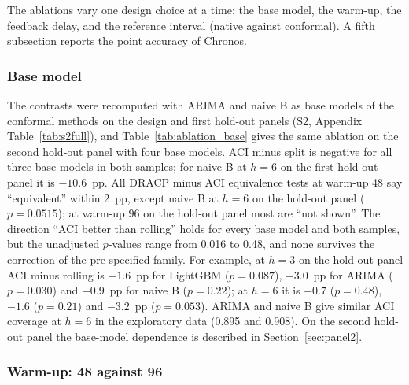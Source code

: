 The ablations vary one design choice at a time: the base model, the warm-up, the feedback delay, and the reference interval (native against conformal). A fifth subsection reports the point accuracy of Chronos.

\subsubsection{Base model}\label{sec:basemodel}

The contrasts were recomputed with ARIMA and naive B as base models of the conformal methods on the design and first hold-out panels (S2, Appendix Table~\ref{tab:s2full}), and Table~\ref{tab:ablation_base} gives the same ablation on the second hold-out panel with four base models. ACI minus split is negative for all three base models in both samples; for naive B at $h=6$ on the first hold-out panel it is $-10.6$~pp. All DRACP minus ACI equivalence tests at warm-up 48 say ``equivalent'' within 2~pp, except naive B at $h=6$ on the hold-out panel ($p=0.0515$); at warm-up 96 on the hold-out panel most are ``not shown''. The direction ``ACI better than rolling'' holds for every base model and both samples, but the unadjusted $p$-values range from 0.016 to 0.48, and none survives the correction of the pre-specified family. For example, at $h=3$ on the hold-out panel ACI minus rolling is $-1.6$~pp for LightGBM ($p=0.087$), $-3.0$~pp for ARIMA ($p=0.030$) and $-0.9$~pp for naive B ($p=0.22$); at $h=6$ it is $-0.7$ ($p=0.48$), $-1.6$ ($p=0.21$) and $-3.2$~pp ($p=0.053$). ARIMA and naive B give similar ACI coverage at $h=6$ in the exploratory data (0.895 and 0.908). On the second hold-out panel the base-model dependence is described in Section~\ref{sec:panel2}.

\begin{table}[t]
\centering
\caption{Ablation over the base model on the second hold-out panel (warm-up 48): relative mean absolute error (naive B $=1$, all target months including flagged months), calibration error of ACI and of rolling, and ACI minus rolling in pp of CE with Holm $p$.}
\label{tab:ablation_base}
\small
\fittable{}
\end{table}

\subsubsection{Warm-up: 48 against 96}\label{sec:warmup}

